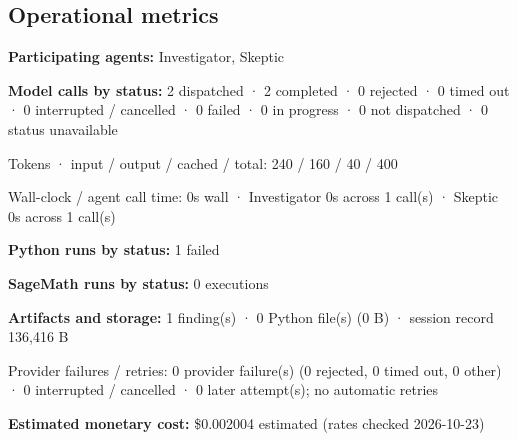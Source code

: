 \documentclass[11pt]{article}
\begin{document}
\subsection{Operational metrics}
\textbf{Participating agents:} Investigator, Skeptic\par
\textbf{Model calls by status:} 2 dispatched · 2 completed · 0 rejected · 0 timed out · 0 interrupted / cancelled · 0 failed · 0 in progress · 0 not dispatched · 0 status unavailable\par
Tokens · input / output / cached / total: 240 / 160 / 40 / 400\par
Wall-clock / agent call time: 0s wall · Investigator 0s across 1 call(s) · Skeptic 0s across 1 call(s)\par
\textbf{Python runs by status:} 1 failed\par
\textbf{SageMath runs by status:} 0 executions\par
\textbf{Artifacts and storage:} 1 finding(s) · 0 Python file(s) (0 B) · session record 136,416 B\par
Provider failures / retries: 0 provider failure(s) (0 rejected, 0 timed out, 0 other) · 0 interrupted / cancelled · 0 later attempt(s); no automatic retries\par
\textbf{Estimated monetary cost:} \$0.002004 estimated (rates checked 2026-10-23)\par
\end{document}

